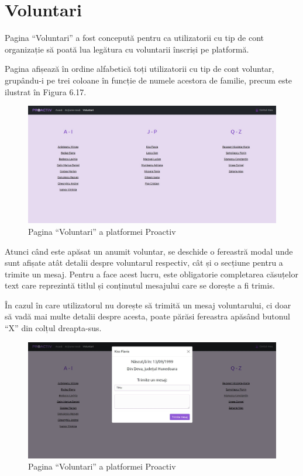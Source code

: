\documentclass[12pt,a4paper]{report}
\begin{document}
\section{Voluntari}
\par
Pagina “Voluntari” a fost concepută pentru ca utilizatorii cu tip de cont organizație să poată lua legătura cu voluntarii înscriși pe platformă.
\\ \par
Pagina afișează în ordine alfabetică toți utilizatorii cu tip de cont voluntar, grupându-i pe trei coloane în funcție de numele acestora de familie, precum este ilustrat în Figura 6.17.
\begin{figure}[H]
\centering
  \includegraphics[width=0.95\linewidth]{./imagini/vol1.jpg}
  \caption{Pagina “Voluntari” a platformei Proactiv}
\end{figure}
\par
Atunci când este apăsat un anumit voluntar, se deschide o fereastră modal unde sunt afișate atât detalii despre voluntarul respectiv, cât și o secțiune pentru a trimite un mesaj. Pentru a face acest lucru, este obligatorie completarea căsuțelor text care reprezintă titlul și conținutul mesajului care se dorește a fi trimis.
\par
În cazul în care utilizatorul nu dorește să trimită un mesaj voluntarului, ci doar să vadă mai multe detalii despre acesta, poate părăsi fereastra apăsând butonul “X” din colțul dreapta-sus.
\begin{figure}[H]
\centering
  \includegraphics[width=0.95\linewidth]{./imagini/vol2.jpg}
  \caption{Pagina “Voluntari” a platformei Proactiv}
\end{figure}
\end{document}

